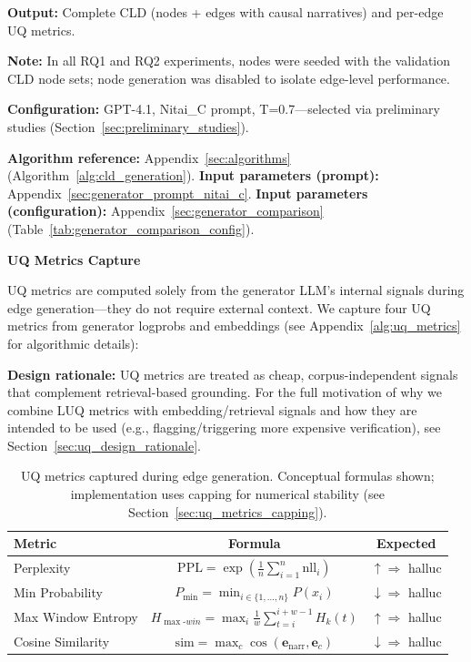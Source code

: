 \textbf{Output:} Complete CLD (nodes + edges with causal narratives) and per-edge UQ metrics.

\textbf{Note:} In all RQ1 and RQ2 experiments, nodes were seeded with the validation CLD node sets; node generation was disabled to isolate edge-level performance.

\textbf{Configuration:} GPT-4.1, Nitai\_C prompt, T=0.7---selected via preliminary studies (Section~\ref{sec:preliminary_studies}).

\textbf{Algorithm reference:} Appendix~\ref{sec:algorithms} (Algorithm~\ref{alg:cld_generation}). \textbf{Input parameters (prompt):} Appendix~\ref{sec:generator_prompt_nitai_c}. \textbf{Input parameters (configuration):} Appendix~\ref{sec:generator_comparison} (Table~\ref{tab:generator_comparison_config}).

\noindent\textbf{UQ Metrics Capture}
\label{sec:uq_metrics_definition}

UQ metrics are computed solely from the generator LLM's internal signals during edge generation---they do not require external context. We capture four UQ metrics from generator logprobs and embeddings (see Appendix~\ref{alg:uq_metrics} for algorithmic details):

\textbf{Design rationale:} UQ metrics are treated as cheap, corpus-independent signals that complement retrieval-based grounding. For the full motivation of why we combine LUQ metrics with embedding/retrieval signals and how they are intended to be used (e.g., flagging/triggering more expensive verification), see Section~\ref{sec:uq_design_rationale}.

\begin{table}[H]
\centering
\footnotesize
\caption{UQ metrics captured during edge generation. Conceptual formulas shown; implementation uses capping for numerical stability (see Section~\ref{sec:uq_metrics_capping}).}
\label{tab:uq_metrics_summary}
\begin{tabular}{@{}lcc@{}}
\toprule
\textbf{Metric} & \textbf{Formula} & \textbf{Expected} \\
\midrule
Perplexity & $\displaystyle\mathrm{PPL} = \exp\left(\frac{1}{n}\sum_{i=1}^{n} \mathrm{nll}_i\right)$ & $\uparrow \Rightarrow$ halluc \\[1.5ex]
Min Probability & $\displaystyle P_{\min} = \min_{i \in \{1,\ldots,n\}} P(x_i)$ & $\downarrow \Rightarrow$ halluc \\[1.5ex]
Max Window Entropy & $\displaystyle H_{\max\text{-}win} = \max_{i}\frac{1}{w}\sum_{t=i}^{i+w-1} H_k(t)$ & $\uparrow \Rightarrow$ halluc \\[1.5ex]
Cosine Similarity & $\displaystyle\mathrm{sim} = \max_c \cos(\mathbf{e}_{\mathrm{narr}},\mathbf{e}_c)$ & $\downarrow \Rightarrow$ halluc \\
\bottomrule
\end{tabular}
\end{table}

